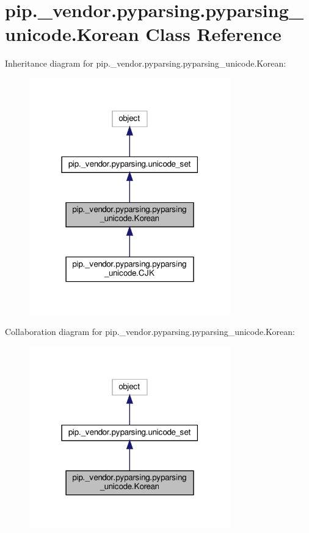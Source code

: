 \hypertarget{classpip_1_1__vendor_1_1pyparsing_1_1pyparsing__unicode_1_1Korean}{}\section{pip.\+\_\+vendor.\+pyparsing.\+pyparsing\+\_\+unicode.\+Korean Class Reference}
\label{classpip_1_1__vendor_1_1pyparsing_1_1pyparsing__unicode_1_1Korean}


Inheritance diagram for pip.\+\_\+vendor.\+pyparsing.\+pyparsing\+\_\+unicode.\+Korean\+:
\nopagebreak
\begin{figure}[H]
\begin{center}
\leavevmode
\includegraphics[width=247pt]{classpip_1_1__vendor_1_1pyparsing_1_1pyparsing__unicode_1_1Korean__inherit__graph}
\end{center}
\end{figure}


Collaboration diagram for pip.\+\_\+vendor.\+pyparsing.\+pyparsing\+\_\+unicode.\+Korean\+:
\nopagebreak
\begin{figure}[H]
\begin{center}
\leavevmode
\includegraphics[width=247pt]{classpip_1_1__vendor_1_1pyparsing_1_1pyparsing__unicode_1_1Korean__coll__graph}
\end{center}
\end{figure}
